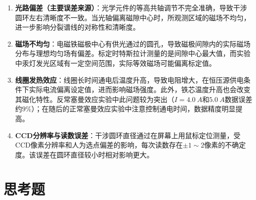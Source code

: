 \documentclass[a4paper,8pt,twocolumn]{article}
\begin{document}
\begin{enumerate}
  \item \textbf{光路偏差（主要误差来源）}：光学元件的等高共轴调节不完全准确，导致干涉圆环左右清晰度不一致。当光轴偏离磁隙中心时，所观测区域的磁场不均匀，进一步影响分裂谱线的对称性和清晰度。

  \item \textbf{磁场不均匀}：电磁铁磁极中心有供光通过的圆孔，导致磁极间隙内的实际磁场分布与理想均匀场有偏差。标定时特斯拉计测量的是间隙中心最大值，而实验中汞灯发光区域有一定空间范围，实际等效磁场可能偏离标定值。

  \item \textbf{线圈发热效应}：线圈长时间通电后温度升高，导致电阻增大，在恒压源供电条件下实际电流偏离设定值，进而影响磁场强度。此外，铁芯温度升高也会改变其磁化特性。反常塞曼效应实验中此问题较为突出（$I = \SI{4.0}{A}$和$\SI{5.0}{A}$数据误差约$9\%$）；在随后的正常塞曼效应实验中注意控制通电时间，数据精度明显提高。

  \item \textbf{CCD分辨率与读数误差}：干涉圆环直径通过在屏幕上用鼠标定位测量，受CCD像素分辨率和人为选点偏差的影响，每次读数存在$\pm 1\sim 2$像素的不确定度。该误差在圆环直径较小时相对影响更大。
\end{enumerate}

\section{思考题}
\end{document}
